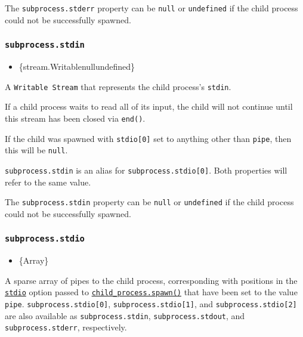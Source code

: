 The \texttt{subprocess.stderr} property can be \texttt{null} or
\texttt{undefined} if the child process could not be successfully
spawned.

\subsubsection{\texorpdfstring{\texttt{subprocess.stdin}}{subprocess.stdin}}\label{subprocess.stdin}

\begin{itemize}
\tightlist
\item
  \{stream.Writable\textbar null\textbar undefined\}
\end{itemize}

A \texttt{Writable\ Stream} that represents the child process's
\texttt{stdin}.

If a child process waits to read all of its input, the child will not
continue until this stream has been closed via \texttt{end()}.

If the child was spawned with \texttt{stdio{[}0{]}} set to anything
other than \texttt{\textquotesingle{}pipe\textquotesingle{}}, then this
will be \texttt{null}.

\texttt{subprocess.stdin} is an alias for
\texttt{subprocess.stdio{[}0{]}}. Both properties will refer to the same
value.

The \texttt{subprocess.stdin} property can be \texttt{null} or
\texttt{undefined} if the child process could not be successfully
spawned.

\subsubsection{\texorpdfstring{\texttt{subprocess.stdio}}{subprocess.stdio}}\label{subprocess.stdio}

\begin{itemize}
\tightlist
\item
  \{Array\}
\end{itemize}

A sparse array of pipes to the child process, corresponding with
positions in the \hyperref[optionsstdio]{\texttt{stdio}} option passed
to
\hyperref[child_processspawncommand-args-options]{\texttt{child\_process.spawn()}}
that have been set to the value
\texttt{\textquotesingle{}pipe\textquotesingle{}}.
\texttt{subprocess.stdio{[}0{]}}, \texttt{subprocess.stdio{[}1{]}}, and
\texttt{subprocess.stdio{[}2{]}} are also available as
\texttt{subprocess.stdin}, \texttt{subprocess.stdout}, and
\texttt{subprocess.stderr}, respectively.

